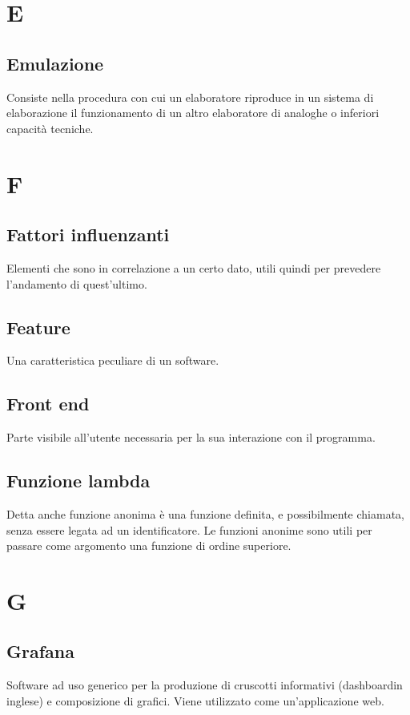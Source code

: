 \clearpage
\section*{E}

\subsection*{Emulazione}
Consiste nella procedura con cui un elaboratore riproduce in un sistema di elaborazione il funzionamento di un altro elaboratore di analoghe o inferiori capacità tecniche.

\clearpage
\section*{F}

\subsection*{Fattori influenzanti}
Elementi che sono in correlazione a un certo dato, utili quindi per prevedere l'andamento di quest'ultimo.

\subsection*{Feature}
Una caratteristica peculiare di un software.

\subsection*{Front end}
Parte visibile all'utente necessaria per la sua interazione con il programma.

\subsection*{Funzione lambda}
Detta anche funzione anonima è una funzione definita, e possibilmente chiamata, senza essere legata ad un identificatore. Le funzioni anonime sono utili per passare come argomento una funzione di ordine superiore.


\clearpage
\section*{G}

\subsection*{Grafana}
Software ad uso generico per la produzione di cruscotti informativi (dashboard\glosp in inglese) e composizione di grafici. Viene utilizzato come un'applicazione web.

